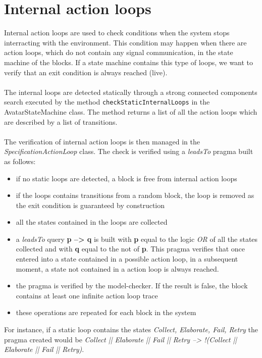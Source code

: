 \documentclass[12pt]{article}
\begin{document}
\section{Internal action loops} \label{sec:il}
Internal action loops are used to check conditions when the system stops interracting with the environment. This condition may happen when there are action loops, which do not contain any signal communication, in the state machine of the blocks. If a state machine contains this type of loops, we want to verify that an exit condition is always reached (live).
\\\\
The internal loops are detected statically through a strong connected components  search executed by the method \texttt{checkStaticInternalLoops} in the AvatarStateMachine class. The method returns a list of all the action loops which are described by a list of transitions.
\\\\
The verification of internal action loops is then managed in the \textit{SpecificationActionLoop} class. The check is verified using a \textit{leadsTo} pragma built as follows:
\begin{itemize}
	\item if no static loops are detected, a block is free from internal action loops
	\item if the loops contains transitions from a random block, the loop is removed as the exit condition is guaranteed by construction
	\item all the states contained in the loops are collected
	\item a \textit{leadsTo} query \textbf{p --> q} is built with \textbf{p} equal to the logic \textit{OR} of all the states collected and with \textbf{q} equal to the not of \textbf{p}. This pragma verifies that once entered into a state contained in a possible action loop, in a subsequent moment, a state not contained in a action loop is always reached.
	\item the pragma is verified by the model-checker. If the result is false, the block contains at least one infinite action loop trace
	\item these operations are repeated for each block in the system
\end{itemize}
For instance, if a static loop contains the states \textit{Collect, Elaborate, Fail, Retry} the pragma created would be \textit{Collect || Elaborate || Fail || Retry --> !(Collect || Elaborate || Fail || Retry)}.
\end{document}
